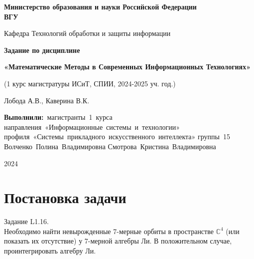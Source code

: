 \href{\href{}{}}{}\documentclass[14pt]{extarticle} %
\begin{document}
\linespread{1,5}
\thispagestyle{empty} %
\begin{titlepage}
    \newpage
    \begin{center}
    {\bfseries Министерство образования и науки Российской Федерации \\
    ВГУ}
    \vspace{1cm}

     Кафедра Технологий обработки и защиты информации
     \vspace{2em}

     \end{center}

    \vspace{5em}

    \begin{center}
    \Large
\textbf{Задание по дисциплине}

\normalsize
\textbf{«Математические Методы в Современных Информационных Технологиях»}

(1 курс магистратуры ИСиТ, СПИИ, 2024-2025 уч. год.)

Лобода А.В., Каверина В.К.
     \end{center}
    \vspace{5em}


   \vbox{%
\hfill%
\vbox{%
\hbox{\textbf{Выполнили:} магистранты 1 курса}%
\hbox{направления «Информационные системы и технологии»}%
\hbox{профиля «Системы прикладного искусственного интеллекта»}%
\hbox{группы 15}%
\hbox{Волченко Полина Владимировна}%
\hbox{Смотрова Кристина Владимировна}%
\hbox{}%
}%
}

    \begin{center}
    \vspace{10em}
    2024
    \end{center}

    \end{titlepage}
\newpage

\tableofcontents
\newpage

\section{Постановка задачи}

Задание L1.16. \\

Необходимо найти невырожденные 7-мерные орбиты в пространстве $ \mathbb{C}^4 $ (или показать их отсутствие) у 7-мерной алгебры Ли. В положительном случае, проинтегрировать алгебру Ли.
\end{document}
